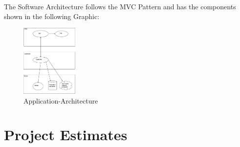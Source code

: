 \documentclass[
	11pt,
	a4paper
]{article}%
\begin{document}
\\\\
The Software Architecture follows the MVC Pattern and has the components shown in the following Graphic:
\begin{figure}[h!]
  \caption{Application-Architecture}
  \centering
    \includegraphics[width=0.25\textwidth]{../Images/application_architecture.png}
\end{figure}


\newpage
\section{Project Estimates}
\end{document}
